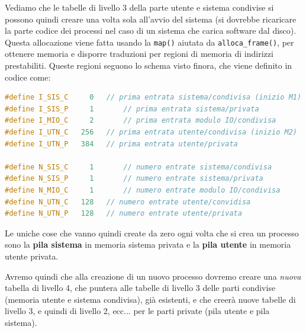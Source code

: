 \documentclass[a4paper,11pt]{article}
\begin{document}
Vediamo che le tabelle di livello 3 della parte utente e sistema condivise si possono quindi creare una volta sola all'avvio del sistema (si dovrebbe ricaricare la parte codice dei processi nel caso di un sistema che carica software dal disco).
Questa allocazione viene fatta usando la \lstinline|map()| aiutata da \lstinline|alloca_frame()|, per ottenere memoria e disporre traduzioni per regioni di memoria di indirizzi prestabiliti.
Queste regioni seguono lo schema visto finora, che viene definito in codice come:
\begin{lstlisting}[language=C++, style=codestyle]	
#define I_SIS_C		0 	// prima entrata sistema/condivisa (inizio M1)
#define I_SIS_P		1		// prima entrata sistema/privata
#define I_MIO_C		2		// prima entrata modulo IO/condivisa
#define I_UTN_C   256	// prima entrata utente/condivisa (inizio M2)
#define I_UTN_P	  384	// prima entrata utente/privata

#define N_SIS_C		1		// numero entrate sistema/condivisa
#define N_SIS_P		1		// numero entrate sistema/privata
#define N_MIO_C		1		// numero entrate modulo IO/condivisa
#define N_UTN_C	  128	// numero entrate utente/convidisa
#define N_UTN_P	  128	// numero entrate utente/privata
\end{lstlisting}

Le uniche cose che vanno quindi create da zero ogni volta che si crea un processo sono la \textbf{pila sistema} in memoria sistema privata e la \textbf{pila utente} in memoria utente privata.

Avremo quindi che alla creazione di un nuovo processo dovremo creare una \textit{nuova} tabella di livello 4, che puntera alle tabelle di livello 3 delle parti condivise (memoria utente e sistema condivisa), già esistenti, e che creerà nuove tabelle di livello 3, e quindi di livello 2, ecc... per le parti private (pila utente e pila sistema).
\end{document}
